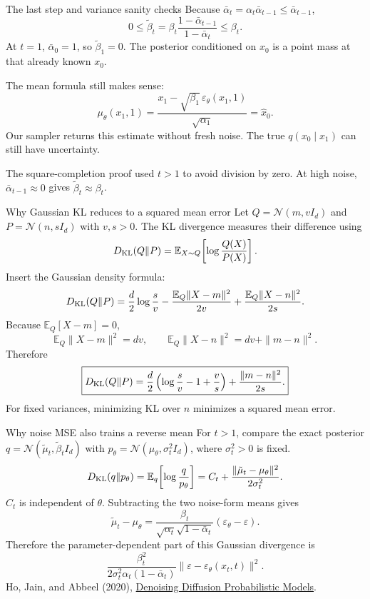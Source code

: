 \documentclass[aspectratio=169,11pt]{beamer}
\newcommand{\ddpmref}{\vfill{\tiny\color{gray}Ho, Jain, and Abbeel (2020), \href{https://arxiv.org/abs/2006.11239}{Denoising Diffusion Probabilistic Models}.}}
\begin{document}
\begin{frame}{The last step and variance sanity checks}
Because $\bar\alpha_t=\alpha_t\bar\alpha_{t-1}\leq\bar\alpha_{t-1}$,
\[0\leq\tilde\beta_t=\beta_t\frac{1-\bar\alpha_{t-1}}{1-\bar\alpha_t}\leq\beta_t.\]
At $t=1$, $\bar\alpha_0=1$, so $\tilde\beta_1=0$. The posterior conditioned on $x_0$ is a point mass at that already known $x_0$.
\par\vspace{2mm}
The mean formula still makes sense:
\[\mu_\theta(x_1,1)=\frac{x_1-\sqrt{\beta_1}\,\varepsilon_\theta(x_1,1)}{\sqrt{\alpha_1}}
=\widehat x_0.\]
Our sampler returns this estimate without fresh noise. The true $q(x_0\mid x_1)$ can still have uncertainty.
\par\vspace{2mm}
\small The square-completion proof used $t>1$ to avoid division by zero. At high noise, $\bar\alpha_{t-1}\approx0$ gives $\tilde\beta_t\approx\beta_t$.
\end{frame}

\begin{frame}{Why Gaussian KL reduces to a squared mean error}
\small
Let $Q=\mathcal N(m,vI_d)$ and $P=\mathcal N(n,sI_d)$ with $v,s>0$.
The KL divergence measures their difference using
\[D_{\rm KL}(Q\|P)=\mathbb E_{X\sim Q}\!\left[\log\frac{Q(X)}{P(X)}\right].\]
Insert the Gaussian density formula:
\[D_{\rm KL}(Q\|P)=\frac d2\log\frac{s}{v}
-\frac{\mathbb E_Q\|X-m\|^2}{2v}
+\frac{\mathbb E_Q\|X-n\|^2}{2s}.\]
Because $\mathbb E_Q[X-m]=0$,
\[\mathbb E_Q\|X-m\|^2=dv,\qquad
\mathbb E_Q\|X-n\|^2=dv+\|m-n\|^2.\]
Therefore
\[\boxed{D_{\rm KL}(Q\|P)=\frac d2\left(\log\frac{s}{v}-1+\frac vs\right)
+\frac{\|m-n\|^2}{2s}.}\]
For fixed variances, minimizing KL over $n$ minimizes a squared mean error.
\end{frame}

\begin{frame}{Why noise MSE also trains a reverse mean}
For $t>1$, compare the exact posterior $q=\mathcal N(\tilde\mu_t,\tilde\beta_t I_d)$ with $p_\theta=\mathcal N(\mu_\theta,\sigma_t^2 I_d)$, where $\sigma_t^2>0$ is fixed.
\[D_{\rm KL}(q\|p_\theta)=\mathbb E_q\!\left[\log\frac{q}{p_\theta}\right]
=C_t+\frac{\|\tilde\mu_t-\mu_\theta\|^2}{2\sigma_t^2}.\]
$C_t$ is independent of $\theta$. Subtracting the two noise-form means gives
\[\tilde\mu_t-\mu_\theta
=\frac{\beta_t}{\sqrt{\alpha_t}\sqrt{1-\bar\alpha_t}}
(\varepsilon_\theta-\varepsilon).\]
Therefore the parameter-dependent part of this Gaussian divergence is
\[\boxed{\frac{\beta_t^2}{2\sigma_t^2\alpha_t(1-\bar\alpha_t)}
\|\varepsilon-\varepsilon_\theta(x_t,t)\|^2.}\]
\ddpmref
\end{frame}
\end{document}

